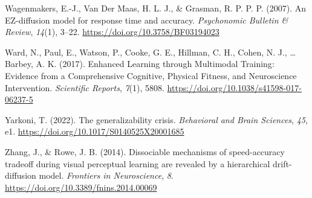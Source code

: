\documentclass[
  english,
  man, donotrepeattitle,floatsintext]{apa6}
\newlength{\cslhangindent}
\newenvironment{CSLReferences}[2] %
 {\begin{list}{}{%
  \setlength{\itemindent}{0pt}
  \setlength{\leftmargin}{0pt}
  \setlength{\parsep}{0pt}
  \ifodd #1
   \setlength{\leftmargin}{\cslhangindent}
   \setlength{\itemindent}{-1\cslhangindent}
  \fi
  \setlength{\itemsep}{#2\baselineskip}}}
 {\end{list}}
\begin{document}
\begin{CSLReferences}{1}{0}
Wagenmakers, E.-J., Van Der Maas, H. L. J., \& Grasman, R. P. P. P. (2007). An {EZ-diffusion} model for response time and accuracy. \emph{Psychonomic Bulletin \& Review}, \emph{14}(1), 3--22. \url{https://doi.org/10.3758/BF03194023}

Ward, N., Paul, E., Watson, P., Cooke, G. E., Hillman, C. H., Cohen, N. J., \ldots{} Barbey, A. K. (2017). Enhanced {Learning} through {Multimodal Training}: {Evidence} from a {Comprehensive Cognitive}, {Physical Fitness}, and {Neuroscience Intervention}. \emph{Scientific Reports}, \emph{7}(1), 5808. \url{https://doi.org/10.1038/s41598-017-06237-5}

Yarkoni, T. (2022). The generalizability crisis. \emph{Behavioral and Brain Sciences}, \emph{45}, e1. \url{https://doi.org/10.1017/S0140525X20001685}

Zhang, J., \& Rowe, J. B. (2014). Dissociable mechanisms of speed-accuracy tradeoff during visual perceptual learning are revealed by a hierarchical drift-diffusion model. \emph{Frontiers in Neuroscience}, \emph{8}. \url{https://doi.org/10.3389/fnins.2014.00069}

\end{CSLReferences}
\end{document}
